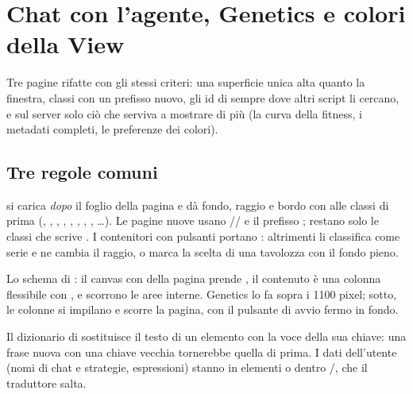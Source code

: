 \section{Chat con l'agente, Genetics e colori della View}\label{sez:studio-pagine}

Tre pagine rifatte con gli stessi criteri: una superficie unica alta quanto
la finestra, classi con un prefisso nuovo, gli id di sempre dove altri script
li cercano, e sul server solo ciò che serviva a mostrare di più (la curva
della fitness, i metadati completi, le preferenze dei colori).

\subsection{Tre regole comuni}

\begin{description}[leftmargin = 1.4em, style = nextline, itemsep = 4pt]
  \item[Prefissi nuovi]  si carica \emph{dopo} il foglio
    della pagina e dà fondo, raggio e bordo con  alle classi
    di prima (, , ,
    , , , ,
    , \ldots). Le pagine nuove usano
    // e il prefisso ;
    restano  solo le classi che scrive .
    I contenitori con pulsanti portano : altrimenti
     li classifica come serie e ne cambia il raggio, o
    marca la scelta di una tavolozza con il fondo pieno.
  \item[Alte quanto la finestra] Lo schema di : il canvas con
     della pagina prende , il
    contenuto è una colonna flessibile con , e scorrono le
    aree interne. Genetics lo fa sopra i \num{1100} pixel; sotto, le colonne
    si impilano e scorre la pagina, con il pulsante di avvio fermo in fondo.
  \item[Niente \cod{data-i18n} sui testi nuovi] Il dizionario di
     sostituisce il testo di un elemento con la voce della sua
    chiave: una frase nuova con una chiave vecchia tornerebbe quella di
    prima. I dati dell'utente (nomi di chat e strategie, espressioni) stanno
    in elementi  o dentro /, che il
    traduttore salta.
\end{description}

